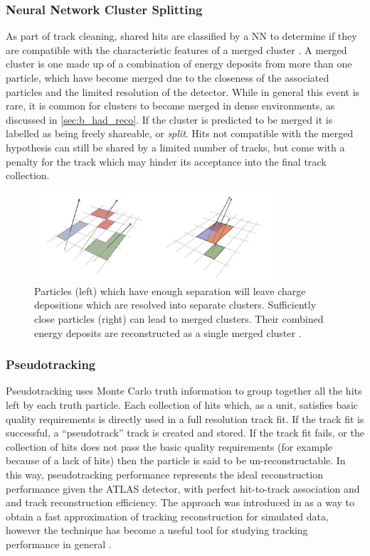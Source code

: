 \subsubsection{Neural Network Cluster Splitting}
As part of track cleaning, shared hits are classified by a NN to determine if they are compatible with the characteristic features of a merged cluster \cite{PERF-2012-05, ATL-PHYS-PUB-2015-006}.
A merged cluster is one made up of a combination of energy deposits from more than one particle, which have become merged due to the closeness of the associated particles and the limited resolution of the detector.
While in general this event is rare, it is common for clusters to become merged in dense environments, as discussed in \cref{sec:b_had_reco}.
If the cluster is predicted to be merged it is labelled as being freely shareable, or \textit{split}.
Hits not compatible with the merged hypothesis can still be shared by a limited number of tracks, but come with a penalty for the track which may hinder its acceptance into the final track collection.
%
\begin{figure}[ht]
    \centering
    \includegraphics[width=0.8\textwidth]{chapters/2.detector/figs/merged-cluster.png}
    \caption{
      Particles (left) which have enough separation will leave charge depositions which are resolved into separate clusters.
      Sufficiently close particles (right) can lead to merged clusters.
      Their combined energy deposits are reconstructed as a single merged cluster \cite{PERF-2015-08}.}
    \label{fig:resolved/merged clusters}
\end{figure}
%

\subsubsection{Pseudotracking}\label{sec:pseudotracks}

Pseudotracking uses Monte Carlo truth information to group together all the hits left by each truth particle.
Each collection of hits which, as a unit, satisfies basic quality requirements is directly used in a full resolution track fit.
If the track fit is successful, a ``pseudotrack'' track is created and stored.
If the track fit fails, or the collection of hits does not pass the basic quality requirements (for example because of a lack of hits) then the particle is said to be un-reconstructable.
In this way, pseudotracking performance represents the ideal reconstruction performance given the ATLAS detector, with perfect hit-to-track association and and track reconstruction efficiency.
The approach was introduced in  as a way to obtain a fast approximation of tracking reconstruction for simulated data, however the technique has become a useful tool for studying tracking performance in general \cite{ATL-PHYS-PUB-2015-006}.


